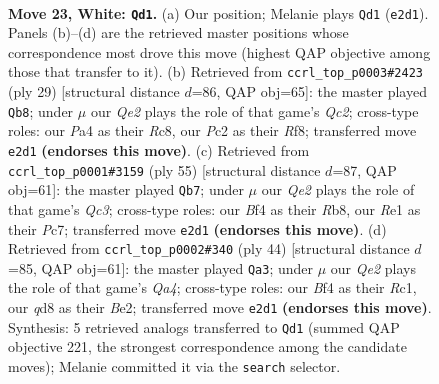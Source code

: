 \documentclass[11pt]{article}
\begin{document}
\clearpage

\begin{figure}[p]\centering
\begin{subfigure}{0.46\textwidth}\centering
\resizebox{\linewidth}{!}{%
\newchessgame
\chessboard[
  setfen={r1bqk2r/5p2/1p2pnp1/p1b4p/P4B1P/1P1B2P1/2PNQPK1/R3R3 w q - 13 23},
  showmover=false,
  pgfstyle=straightmove, color=movearrow, markmove={e2-d1}
]}
\caption{}
\end{subfigure}\hfill
\begin{subfigure}{0.46\textwidth}\centering
\resizebox{\linewidth}{!}{%
\newchessgame
\chessboard[
  setfen={2r2rk1/2qpbppp/p1b1p3/1p1nP3/3BNP2/P5Q1/1PP1B1PP/R3K2R b KQ - 4 15},
  showmover=false,
  pgfstyle=straightmove, color=movearrow, markmove={c7-b8}
]}
\caption{}
\end{subfigure}
\\[4pt]
\begin{subfigure}{0.46\textwidth}\centering
\resizebox{\linewidth}{!}{%
\newchessgame
\chessboard[
  setfen={1r4k1/2p2rp1/2qbbp1p/4p3/p3P2N/P1B3PP/1P1RPPK1/1QR5 b - - 11 28},
  showmover=false,
  pgfstyle=straightmove, color=movearrow, markmove={c6-b7}
]}
\caption{}
\end{subfigure}\hfill
\begin{subfigure}{0.46\textwidth}\centering
\resizebox{\linewidth}{!}{%
\newchessgame
\chessboard[
  setfen={2r3k1/p2rqpb1/1p1p1np1/1P2pb1p/QBP5/4P2P/P2NBPP1/2RR2K1 w - - 1 23},
  showmover=false,
  pgfstyle=straightmove, color=movearrow, markmove={a4-a3}
]}
\caption{}
\end{subfigure}
\caption{\textbf{Move 23, White: \texttt{Qd1}.} (a) Our position; Melanie plays \texttt{Qd1} (\texttt{e2d1}). Panels (b)--(d) are the retrieved master positions whose correspondence most drove this move (highest QAP objective among those that transfer to it). (b) Retrieved from \texttt{ccrl\_top\_p0003\#2423} (ply 29) [structural distance $d$=86, QAP obj=65]: the master played \texttt{Qb8}; under $\mu$ our \emph{Qe2} plays the role of that game's \emph{Qc2}; cross-type roles: our \emph{P}a4 as their \emph{R}c8, our \emph{P}c2 as their \emph{R}f8; transferred move \texttt{e2d1} \textbf{(endorses this move)}. (c) Retrieved from \texttt{ccrl\_top\_p0001\#3159} (ply 55) [structural distance $d$=87, QAP obj=61]: the master played \texttt{Qb7}; under $\mu$ our \emph{Qe2} plays the role of that game's \emph{Qc3}; cross-type roles: our \emph{B}f4 as their \emph{R}b8, our \emph{R}e1 as their \emph{P}c7; transferred move \texttt{e2d1} \textbf{(endorses this move)}. (d) Retrieved from \texttt{ccrl\_top\_p0002\#340} (ply 44) [structural distance $d$=85, QAP obj=61]: the master played \texttt{Qa3}; under $\mu$ our \emph{Qe2} plays the role of that game's \emph{Qa4}; cross-type roles: our \emph{B}f4 as their \emph{R}c1, our \emph{q}d8 as their \emph{B}e2; transferred move \texttt{e2d1} \textbf{(endorses this move)}. Synthesis: 5 retrieved analogs transferred to \texttt{Qd1} (summed QAP objective 221, the strongest correspondence among the candidate moves); Melanie committed it via the \texttt{search} selector.}
\label{fig:thought-m44}
\end{figure}
\end{document}
